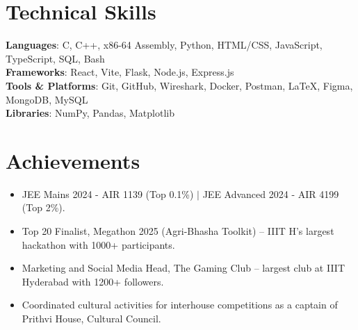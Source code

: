 \documentclass[letterpaper,11pt]{article}
\makeatletter
\newcommand{\resumeItem}[1]{
  \item \small #1\vspace{-3pt}
}
\newcommand{\resumeProjectHeading}[2]{
    \item
    \begin{tabular*}{0.97\textwidth}{l@{\extracolsep{\fill}}r}
      \small#1 & #2 \\
    \end{tabular*}\vspace{-7pt}
}
\newcommand{\resumeSubHeadingListStart}{\begin{itemize}[leftmargin=0.15in, label={}]}
\newcommand{\resumeSubHeadingListEnd}{\end{itemize}}
\newcommand{\resumeItemListStart}{\begin{itemize}}
\newcommand{\resumeItemListEnd}{\end{itemize}\vspace{-5pt}}
\makeatother
\begin{document}
\section{Technical Skills}
\begin{itemize}[leftmargin=0.15in, label={}]
    \small{\item{
          \textbf{Languages}{: C, C++, x86-64 Assembly, Python, HTML/CSS, JavaScript, TypeScript, SQL, Bash} \\
          \textbf{Frameworks}{: React, Vite, Flask, Node.js, Express.js} \\
          \textbf{Tools \& Platforms}{: Git, GitHub, Wireshark, Docker, Postman, LaTeX, Figma, MongoDB, MySQL} \\
          \textbf{Libraries}{: NumPy, Pandas, Matplotlib} \\
          }}
\end{itemize}

\section{Achievements}
\resumeItemListStart
\resumeItem
{JEE Mains 2024 - AIR 1139 (Top 0.1\%) $|$ JEE Advanced 2024 - AIR 4199 (Top 2\%).}{}
\resumeItem
{Top 20 Finalist, Megathon 2025 (Agri-Bhasha Toolkit) -- IIIT H's largest hackathon with 1000+ participants.}{}
\resumeItem
{Marketing and Social Media Head, The Gaming Club -- largest club at IIIT Hyderabad with 1200+ followers.}{}
\resumeItem
{Coordinated cultural activities for interhouse competitions as a captain of Prithvi House, Cultural Council.}{}
\resumeItemListEnd


\end{document}
